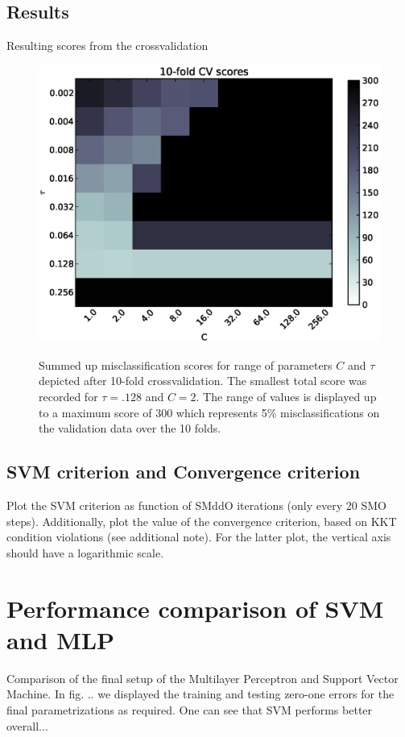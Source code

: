 \subsection{Results}
Resulting scores from the crossvalidation
\begin{figure}[!ht]
	\centering
	\includegraphics[width=.6\textwidth]{svm/scores_max_300.eps}
	\label{fig:scores}
	\caption{Summed up misclassification scores for range of parameters $C$ and $\tau$ depicted after 10-fold crossvalidation. The smallest total score was recorded for $\tau=.128$ and $C=2$. The range of values is displayed up to a maximum score of 300 which represents 5\% misclassifications on the validation data over the 10 folds.}
\end{figure}

\subsection{SVM criterion and Convergence criterion}
Plot the SVM criterion as function of SMddO iterations (only
every 20 SMO steps). Additionally, plot the value of the convergence criterion,
based on KKT condition violations (see additional note). For the latter plot,
the vertical axis should have a logarithmic scale.
\section{Performance comparison of SVM and MLP}
Comparison of the final setup of the Multilayer Perceptron and Support Vector Machine. In fig. .. we displayed the training and testing zero-one errors for the final parametrizations as required. One can see that SVM performs better overall...

